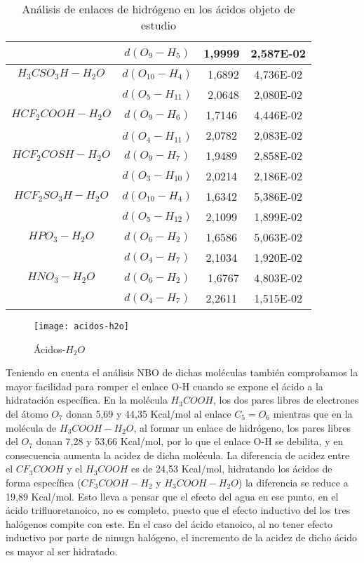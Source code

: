 \begin{table}[H]
\begin{tabular}{|c|c|c|c|}
	& $d(O_9-H_5)$	& ﻿1,9999	& 2,587E-02 \\ \hline
 $H_3CSO_3H-H_2O$	& $d(O_{10}-H_4)$	&﻿ 1,6892	& 4,736E-02 \\ \cline{2-4}
	& $d(O_5-H_{11})$	&﻿ 2,0648 &	2,080E-02 \\ \hline
 $HCF_2COOH-H_2O$	& $d(O_9-H_6)$	&﻿1,7146	& 4,446E-02 \\ \cline{2-4}
	& $d(O_4-H_{11})$﻿ & 2,0782	& 2,083E-02 \\ \hline
 $HCF_2COSH-H_2O$	& $d(O_9-H_7)$ &1,9489 & 2,858E-02 \\ \cline{2-4}
	& $d(O_3-H_{10})$ & 2,0214 &	2,186E-02 \\ \hline
 $HCF_2SO_3H-H_2O$	& $d(O_{10}-H_4)$ & 1,6342	& 5,386E-02 \\ \cline{2-4}
&	$d(O_5-H_{12})$ & 2,1099	& 1,899E-02 \\ \hline
 $HPO_3-H_2O$	& $d(O_6-H_2)$ & 1,6586	& 5,063E-02 \\ \cline{2-4}
	& $d(O_4-H_7)$ & 2,1034	& 1,920E-02 \\ \hline
 $HNO_3-H_2O$	& $d(O_6-H_2)$	&﻿ 1,6767	& 4,803E-02 \\ \cline{2-4}
	& $d(O_4-H_7)$ & 2,2611	& 1,515E-02 \\ \hline
	\end{tabular}
\caption{Análisis de enlaces de hidrógeno en los ácidos objeto de estudio}
\end{table}
\begin{figure}[H]
	\centering
	\texttt{[image: acidos-h2o]}
	\caption{Ácidos-$H_2O$}
\end{figure}
 Teniendo en cuenta el análisis NBO de dichas moléculas también comprobamos la mayor facilidad para romper el enlace O-H cuando se expone el ácido a la hidratación específica. En la molécula $H_3COOH$, los dos pares libres de electrones del átomo $O_7$ donan 5,69 y 44,35 Kcal/mol al enlace $C_5=O_6$ mientras que en la molécula de $H_3COOH-H_2O$, al formar un enlace de hidrógeno, los pares libres del $O_7$ donan 7,28 y 53,66 Kcal/mol, por lo que el enlace O-H se debilita, y en consecuencia aumenta la acidez de dicha molécula.
 La diferencia de acidez entre el $CF_3COOH$ y el $H_3COOH$ es de 24,53 Kcal/mol, hidratando los ácidos de forma específica ($CF_3COOH-H_2$ y $H_3COOH-H_2O$) la diferencia se reduce a 19,89 Kcal/mol. Esto lleva a pensar que el efecto del agua en ese punto, en el ácido trifluoretanoico, no es completo, puesto que el efecto inductivo del los tres halógenos compite con este. En el caso del ácido etanoico, al no tener efecto inductivo por parte de ninugn halógeno, el incremento de la acidez de dicho ácido es mayor al ser hidratado.
